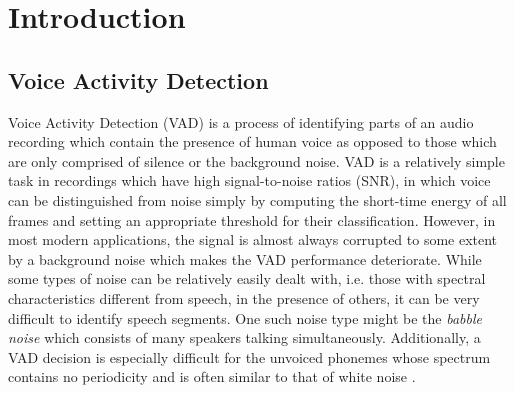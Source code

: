 
\chapter{Introduction} %

\label{Chapter1} %



\section{Voice Activity Detection}

Voice Activity Detection (VAD) is a process of identifying parts of an audio recording which contain the presence of human voice as opposed to those which are only comprised of silence or the background noise. VAD is a relatively simple task in recordings which have high signal-to-noise ratios (SNR), in which voice can be distinguished from noise simply by computing the short-time energy of all frames and setting an appropriate threshold for their classification. However, in most modern applications, the signal is almost always corrupted to some extent by a background noise which makes the VAD performance deteriorate. While some types of noise can be relatively easily dealt with, i.e. those with spectral characteristics different from speech, in the presence of others, it can be very difficult to identify speech segments. One such noise type might be the \emph{babble noise} which consists of many speakers talking simultaneously. Additionally, a VAD decision is especially difficult for the unvoiced phonemes whose spectrum contains no periodicity and is often similar to that of white noise \cite{Kondoz, Michaelis}.

